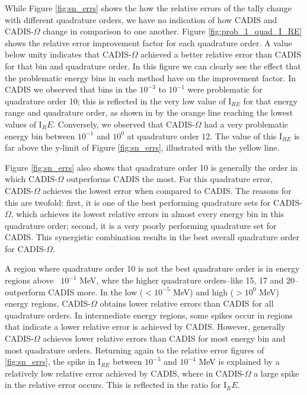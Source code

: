 While Figure \ref{fig:sn_errs} shows the how the relative errors of the tally
change with different quadrature orders, we have no indication of how CADIS and
CADIS-$\Omega$ change in comparison to one another. Figure
\ref{fig:prob_1_quad_I_RE} shows the relative error improvement factor for each
quadrature order. A value below unity indicates that CADIS-$\Omega$ achieved a
better relative error than CADIS for that bin and quadrature order. In this
figure we can clearly see the effect that the problematic energy bins in each
method have on the improvement factor. In CADIS we observed that bins in the
$10^{-3}$ to $10^{-1}$ were problematic for quadrature order 10; this is
reflected in the very low value of I$_{RE}$ for that energy range and quadrature
order, as shown in by the orange line reaching the lowest values of I$_RE$.
Conversely, we observed that CADIS-$\Omega$ had a very problematic energy
bin between $10^{-1}$ and $10^{0}$ at quadrature order 12. The value of this
I$_{RE}$ is far above the y-limit of Figure \ref{fig:sn_errs}, illustrated with
the yellow line.

Figure \ref{fig:sn_errs} also shows that quadrature order 10 is generally the order
in which CADIS-$\Omega$ outperforms CADIS the most. For this quadrature error,
CADIS-$\Omega$ achieves the lowest error when compared to CADIS. The reasons for
this are twofold: first, it is one of the best performing quadrature sets for
CADIS-$\Omega$, which achieves its lowest relative errors in almost every energy
bin in this quadrature order; second, it is a very poorly performing quadrature
set for CADIS. This synergistic combination results in the best overall
quadrature order for CADIS-$\Omega$.

A region where quadrature order 10 is not the best quadrature order is
in energy regions above ~$10^{-1}$ MeV, whre the higher quadrature
orders--like 15, 17 and 20--outperform CADIS more.
In the low ($<10^{-5}$ MeV) and high ($>10^{0}$ MeV) energy
regions,
CADIS-$\Omega$ obtains lower relative errors than CADIS for all quadrature
orders. In intermediate energy regions, some spikes occur in regions that
indicate a lower relative error is achieved by CADIS. However, generally
CADIS-$\Omega$ achieves lower relative errors than CADIS for most energy bin and
most quadrature orders. Returning again to the
relative error figures of \ref{fig:sn_errs}, the spike in I$_{RE}$ between
$10^{-5}$ and $10^{-4}$
MeV is explained by a relatively low relative error achieved by CADIS, where in
CADIS-$\Omega$ a large spike in the relative error occurs. This is reflected in
the ratio for I$_RE$.

